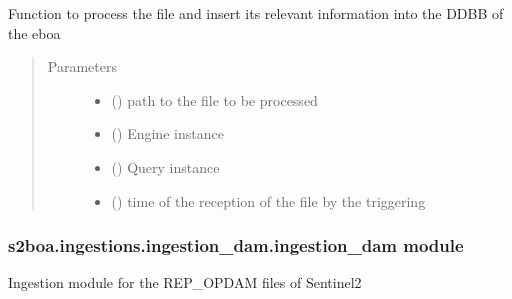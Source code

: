 \begin{fulllineitems}
\label{\detokenize{s2boa.ingestions:s2boa.ingestions.ingestion_ai.ingestion_ai.process_file}}
Function to process the file and insert its relevant information
into the DDBB of the eboa
\begin{quote}\begin{description}
\item[{Parameters}] \leavevmode\begin{itemize}
\item {} 
 () \textendash{} path to the file to be processed

\item {} 
 () \textendash{} Engine instance

\item {} 
 () \textendash{} Query instance

\item {} 
 () \textendash{} time of the reception of the file by the triggering

\end{itemize}

\end{description}\end{quote}

\end{fulllineitems}



\subsubsection{s2boa.ingestions.ingestion\_dam.ingestion\_dam module}
\label{\detokenize{s2boa.ingestions:module-s2boa.ingestions.ingestion_dam.ingestion_dam}}\label{\detokenize{s2boa.ingestions:s2boa-ingestions-ingestion-dam-ingestion-dam-module}}
Ingestion module for the REP\_OPDAM files of Sentinel\sphinxhyphen{}2

